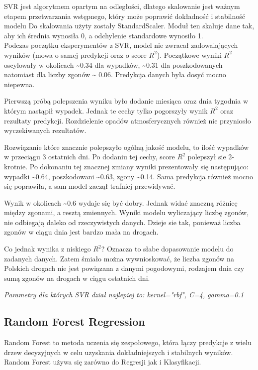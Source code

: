 \documentclass{article}
\begin{document}
SVR jest algorytmem opartym na odległości, dlatego skalowanie jest ważnym etapem przetwarzania wstępnego, który może poprawić dokładność i stabilność modelu
Do skalowania użyty zostały StandardScaler. Moduł ten  skaluje dane tak, aby ich średnia wynosiła 0, a odchylenie standardowe wynosiło 1.\\

Podczas początku eksperymentów z SVR, model nie zwracał zadowalających wyników (mowa o samej predykcji oraz o score \(R^2\)). Początkowe wyniki \(R^2\) oscylowały w okolicach \textasciitilde 0.34 dla wypadków, \textasciitilde 0.31 dla poszkodowanych natomiast dla liczby zgonów \textasciitilde
0.06. Predykcja danych była dosyć mocno niepewna. 

Pierwszą próbą polepszenia wyniku było dodanie miesiąca oraz dnia tygodnia w którym nastąpił wypadek. Jednak te cechy tylko pogorszyły wynik \(R^2\) oraz rezultaty predykcji. Rozdzielenie opadów atmosferycznych również nie przyniosło wyczekiwanych rezultatów. 

Rozwiązanie które znacznie polepszyło ogólną jakość modelu, to ilość wypadków w przeciągu 3 ostatnich dni. Po dodaniu tej cechy, score \(R^2\) polepszył sie 2-krotnie. Po dokonaniu tej znacznej zmiany wyniki prezentowały się następująco: wypadki  \textasciitilde 0.64, poszkodowani \textasciitilde 0.63, zgony \textasciitilde 0.14. 
Sama predykcja również mocno się poprawiła, a sam model zaczął trafniej przewidywać.

Wynik w okolicach \textasciitilde0.6 wydaje się być dobry. Jednak widać znaczną różnicę między zgonami, a resztą zmiennych. Wyniki modelu wyliczający liczbę zgonów, nie odbiegają daleko od rzeczywistych danych. Dzieje sie tak, ponieważ liczba zgonów w ciągu dnia jest bardzo mała na drogach. 

Co jednak wynika z niskiego \(R^2\)? Oznacza to słabe dopasowanie modelu do zadanych danych. Zatem śmiało można wywnioskować, że liczba zgonów na Polskich drogach nie jest powiązana z danymi pogodowymi, rodzajem dnia czy sumą zgonów na drogach w ciągu ostatnich dni.

\textit{Parametry dla których SVR dział najlepiej to: kernel="rbf", C=4, gamma=0.1}

\subsection{Random Forest Regression}
Random Forest to metoda uczenia się zespołowego, która łączy predykcje z wielu drzew decyzyjnych w celu uzyskania dokładniejszych i stabilnych wyników. Random Forest używa się zarówno do Regresji jak i Klasyfikacji.
\end{document}
